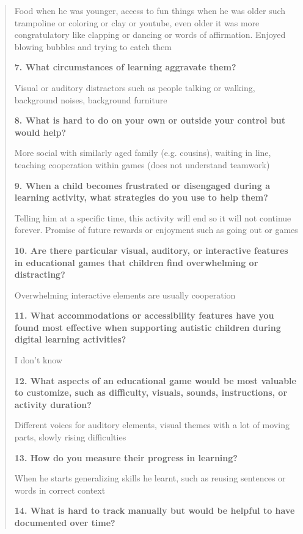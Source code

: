 \documentclass[12pt, titlepage]{article}
\begin{document}
\begin{quote}
\noindent Food when he was younger, access to fun things when he was older such trampoline or coloring or clay or youtube, even older it was more congratulatory like clapping or dancing or words of affirmation. Enjoyed blowing bubbles and trying to catch them

\noindent\textbf{7. What circumstances of learning aggravate them?}

\noindent Visual or auditory distractors such as people talking or walking, background noises, background furniture

\noindent\textbf{8. What is hard to do on your own or outside your control but would help?}

\noindent More social with similarly aged family (e.g. cousins), waiting in line, teaching cooperation within games (does not understand teamwork)

\noindent\textbf{9. When a child becomes frustrated or disengaged during a learning activity, what strategies do you use to help them?}

\noindent Telling him at a specific time, this activity will end so it will not continue forever. Promise of future rewards or enjoyment such as going out or games

\noindent\textbf{10. Are there particular visual, auditory, or interactive features in educational games that children find overwhelming or distracting?}

\noindent Overwhelming interactive elements are usually cooperation

\noindent\textbf{11. What accommodations or accessibility features have you found most effective when supporting autistic children during digital learning activities?}

\noindent I don’t know

\noindent\textbf{12. What aspects of an educational game would be most valuable to customize, such as difficulty, visuals, sounds, instructions, or activity duration?}

\noindent Different voices for auditory elements, visual themes with a lot of moving parts, slowly rising difficulties

\noindent\textbf{13. How do you measure their progress in learning?}

\noindent When he starts generalizing skills he learnt, such as reusing sentences or words in correct context

\noindent\textbf{14. What is hard to track manually but would be helpful to have documented over time?}


\end{quote}
\end{document}
